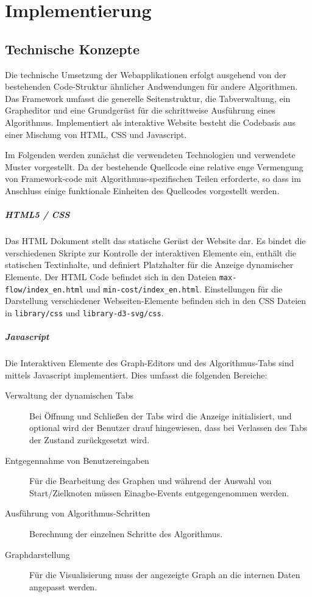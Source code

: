 \chapter{Implementierung}

\section{Technische Konzepte}

Die technische Umsetzung der Webapplikationen erfolgt ausgehend von der bestehenden Code-Struktur ähnlicher Andwendungen für andere Algorithmen. Das Framework umfasst die generelle Seitenstruktur, die Tabverwaltung, ein Grapheditor und eine Grundgerüst für die schrittweise Ausführung eines Algorithmus. Implementiert als interaktive Website besteht die Codebasis aus einer Mischung von HTML, CSS und Javascript. 

Im Folgenden werden zunächst die verwendeten Technologien und verwendete Muster vorgestellt. Da der bestehende Quellcode eine relative enge Vermengung von Framework-code mit Algorithmus-spezifischen Teilen erforderte, so dass im Anschluss einige funktionale Einheiten des Quellcodes vorgestellt werden.

\paragraph{HTML5 / CSS}
Das HTML Dokument stellt das statische Gerüst der Website dar. Es bindet die verschiedenen Skripte zur Kontrolle der interaktiven Elemente ein, enthält die statischen Textinhalte, und definiert Platzhalter für die Anzeige dynamischer Elemente. Der HTML Code befindet sich in den Dateien \texttt{max-flow/index\_en.html} und \texttt{min-cost/index\_en.html}. Einstellungen für die Darstellung verschiedener Webseiten-Elemente befinden sich in den CSS Dateien in \texttt{library/css} und \texttt{library-d3-svg/css}.

\paragraph{Javascript}
Die Interaktiven Elemente des Graph-Editors und des Algorithmus-Tabs sind mittels Javascript implementiert. Dies umfasst die folgenden Bereiche:

\begin{description}
    \item [Verwaltung der dynamischen Tabs] Bei Öffnung und Schließen der Tabs wird die Anzeige initialisiert, und optional wird der Benutzer drauf hingewiesen, dass bei Verlassen des Tabs der Zustand zurückgesetzt wird.
    \item [Entgegennahme von Benutzereingaben] Für die Bearbeitung des Graphen und während der Auswahl von Start/Zielknoten müssen Einagbe-Events entgegengenommen werden.
    \item [Ausführung von Algorithmus-Schritten] Berechnung der einzelnen Schritte des Algorithmus.
    \item [Graphdarstellung] Für die Visualisierung muss der angezeigte Graph an die internen Daten angepasst werden.
\end{description}

